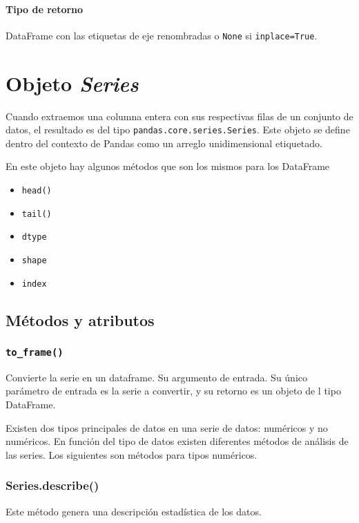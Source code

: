         \paragraph{Tipo de retorno}
        DataFrame con las etiquetas de eje renombradas o \texttt{None} si \texttt{inplace=True}.




    \section{Objeto \textit{Series}}

    Cuando extraemos una columna entera con sus respectivas filas de un conjunto de datos, el resultado es del tipo \texttt{pandas.core.series.Series}. Este objeto se define dentro del contexto de Pandas como un arreglo unidimensional etiquetado.

    En este objeto hay algunos métodos que son los mismos para los DataFrame

    \begin{itemize}
        \item \texttt{head()}
        \item \texttt{tail()}
        \item \texttt{dtype}
        \item \texttt{shape}
        \item \texttt{index}
    \end{itemize}

    \subsection{Métodos y atributos}

    \subsubsection{\texttt{to\_frame()}} Convierte la serie en un dataframe. Su argumento de entrada. Su único parámetro de entrada es la serie a convertir, y su retorno es un objeto de l tipo DataFrame.

    Existen dos tipos principales de datos en una serie de datos: numéricos y no numéricos. En función del tipo de datos existen diferentes métodos de análisis de las series. Los siguientes son métodos para tipos numéricos.

    \subsubsection{Series.describe()} Este método genera una descripción estadística de los datos.


